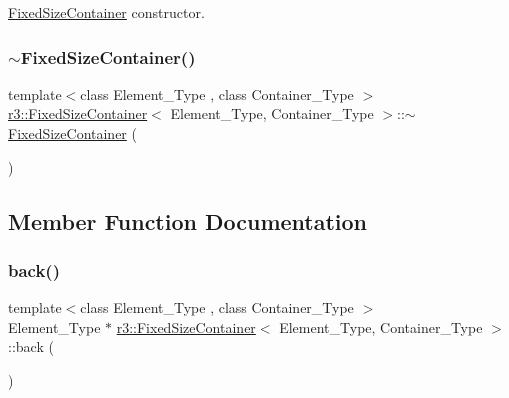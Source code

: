 \mbox{\hyperlink{classr3_1_1_fixed_size_container}{Fixed\+Size\+Container}} constructor. 

\mbox{\label{classr3_1_1_fixed_size_container_af235a796be8de5a9e96c788b676b59fa}} 
\subsubsection{\texorpdfstring{$\sim$\+Fixed\+Size\+Container()}{~FixedSizeContainer()}}
{\footnotesize\ttfamily template$<$class Element\+\_\+\+Type , class Container\+\_\+\+Type $>$ \\
\mbox{\hyperlink{classr3_1_1_fixed_size_container}{r3\+::\+Fixed\+Size\+Container}}$<$ Element\+\_\+\+Type, Container\+\_\+\+Type $>$\+::$\sim$\mbox{\hyperlink{classr3_1_1_fixed_size_container}{Fixed\+Size\+Container}} (\begin{DoxyParamCaption}{ }\end{DoxyParamCaption})\hspace{0.3cm}{\ttfamily [default]}}



\subsection{Member Function Documentation}
\mbox{\label{classr3_1_1_fixed_size_container_a6e849d08e5ad5a1a0ef6207f8b36b22e}} 
\subsubsection{\texorpdfstring{back()}{back()}}
{\footnotesize\ttfamily template$<$class Element\+\_\+\+Type , class Container\+\_\+\+Type $>$ \\
Element\+\_\+\+Type $\ast$ \mbox{\hyperlink{classr3_1_1_fixed_size_container}{r3\+::\+Fixed\+Size\+Container}}$<$ Element\+\_\+\+Type, Container\+\_\+\+Type $>$\+::back (\begin{DoxyParamCaption}{ }\end{DoxyParamCaption})}



